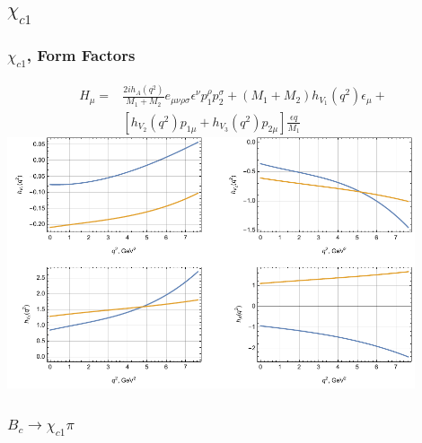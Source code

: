 \documentclass{beamer}
\begin{document}
\subsection{$\chi_{c1}$}
\begin{frame}
  \frametitle{$\chi_{c1}$, Form Factors}
  \begin{align*}
    \label{eq:1}
    H_\mu =& \frac{2i h_A(q^2)}{M_1+M_2}e_{\mu\nu\rho\sigma}\epsilon^\nu p_1^\rho p_2^\sigma
             + (M_1+M_2) h_{V_1}(q^2)\epsilon_\mu + \\
     & [h_{V_2}(q^2)p_{1\mu} + h_{V_3}(q^2)p_{2\mu}]\frac{\epsilon q}{M_1}
  \end{align*}
  \includegraphics[width=0.9\textwidth]{figs/ff_chi_c1}
\end{frame}

\begin{frame}
  \frametitle{$B_c \to \chi_{c1} \pi$}
  \begin{columns}
    \begin{column}{0.5\textwidth}
      \centering{[Ebert]:}
      
    \end{column}
    \begin{column}{0.5\textwidth}
      \centering{[Wang]:}
      
    \end{column}
  \end{columns}
\end{frame}
\end{document}
